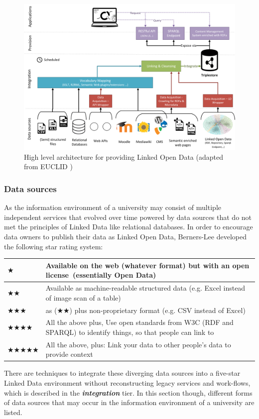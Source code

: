 \documentclass{article}
\begin{document}
\begin{figure}[t]
\centering \includegraphics*[width=0.9\columnwidth]{lod_technical_architecture.png}
\caption{High level architecture for providing Linked Open Data (adapted from EUCLID {\cite{simperl_using_2013}})}
\label{fig:tac-high-level-architecture}
\end{figure}

\subsubsection{Data sources}
\label{technical-architecture-challenges:proposal:data-source}
As the information environment of a university may consist of multiple independent services that evolved over time powered by data sources that do not met the principles of Linked Data like relational databases. In order to encourage data owners to publish their data as Linked Open Data, Berners-Lee developed the following star rating system: \cite{artivle:bernerslee-t-2006-1}\\
\begin{center}
\begin{tabular}{p{2cm}  p{10cm}}
		$\bigstar$ & Available on the web (whatever format) but with an open license~(essentially Open Data) \\
		\hline
		$\bigstar\bigstar$ & Available as machine-readable structured data (e.g. Excel instead of image scan of a table)\\
		\hline
		$\bigstar\bigstar\bigstar$ & as ($\bigstar\bigstar$) plus non-proprietary format (e.g. CSV instead of Excel)\\
		\hline
		$\bigstar\bigstar\bigstar\bigstar$ & All the above plus, Use open standards from W3C (RDF and SPARQL) to identify things, so that people can link to\\
		\hline
		$\bigstar\bigstar\bigstar\bigstar\bigstar$ & All the above, plus: Link your data to other people's data to provide context\\
\end{tabular}
\end{center}
There are techniques to integrate these diverging data sources into a five-star Linked Data environment without reconstructing legacy services and work-flows, which is described in the \textbf{\textit{integration}} tier. In this section though, different forms of data sources that may occur in the information environment of a university are listed. 
\end{document}
